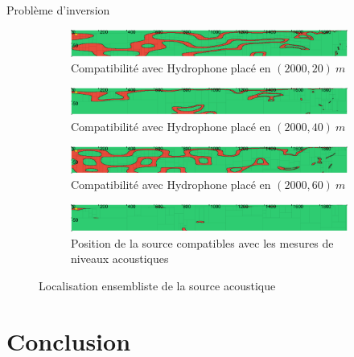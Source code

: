 \documentclass[9pt, xcolor={usenames, dvipsnames}]{beamer}
\begin{document}
			\begin{frame}{Problème d'inversion}
				\begin{figure}[!htb]
					\begin{subfigure}[!htb]{\textwidth}
						\includegraphics[width=\textwidth]{images/Hydrophone_20_2000.png}
						\caption{Compatibilité avec Hydrophone placé en $(2000, 20)\ m$}
					\end{subfigure}
					\begin{subfigure}[!htb]{\textwidth}
						\includegraphics[width=\textwidth]{images/Hydrophone_40_2000.png}
						\caption{Compatibilité avec Hydrophone placé en $(2000, 40)\ m$}
					\end{subfigure}
					\begin{subfigure}[!htb]{\textwidth}
						\includegraphics[width=\textwidth]{images/Hydrophone_60_2000.png}
						\caption{Compatibilité avec Hydrophone placé en $(2000, 60)\ m$}
					\end{subfigure}
					\begin{subfigure}[!htb]{\textwidth}
						\includegraphics[width=\textwidth]{images/Proteus.png}
						\caption{Position de la source compatibles avec les mesures de niveaux acoustiques}
					\end{subfigure}
					\caption{Localisation ensembliste de la source acoustique}
				\end{figure}
			\end{frame}

		\section{Conclusion}
		
\end{document}

